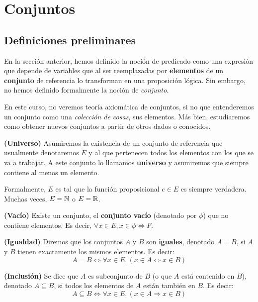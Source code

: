 
\section{Conjuntos}

\subsection{Definiciones preliminares}

En la sección anterior, hemos definido la noción de predicado como una expresión que depende de variables que al ser reemplazadas por \textbf{elementos} de un \textbf{conjunto} de referencia lo transforman en una proposición lógica. Sin embargo, no hemos definido formalmente la noción de \textit{conjunto}. 

En este curso, no veremos teoría axiomática de conjuntos, si no que entenderemos un conjunto como una \textit{colección de cosas}, sus elementos. Más bien, estudiaremos como obtener nuevos conjuntos a partir de otros dados o conocidos. 

\begin{definicion}
	\textbf{(Universo)}
	Asumiremos la existencia de un conjunto de referencia que usualmente denotaremos $E$ y al que pertenecen todos los elementos con los que se va a trabajar. A este conjunto lo llamamos \textbf{universo} y asumiremos que siempre contiene al menos un elemento. 
	
	Formalmente, $E$ es tal que la función proposicional $e\in E$ es siempre verdadera. Muchas veces, $E = \mathbb{N}$ o $E = \mathbb{R}$. 
\end{definicion}

\begin{definicion}
	\textbf{(Vacío)}
	Existe un conjunto, el \textbf{conjunto vacío} (denotado por $\phi$) que no contiene elementos. Es decir, $\forall x \in E, x \in \phi \iff F$. 
\end{definicion}

\begin{definicion}
	\textbf{(Igualdad)}
	Diremos que los conjuntos $A$ y $B$ son \textbf{iguales}, denotado $A=B$, si $A$ y $B$ tienen exactamente los mismos elementos. Es decir: 
	$$ A = B \iff \forall x \in E, (x \in A \iff x \in B ) $$ 
\end{definicion}

\begin{definicion}
	\textbf{(Inclusión)}
	Se dice que $A$ es subconjunto de $B$ (o que $A$ está contenido en $B$), denotado $A\subseteq B$, si todos los elementos de $A$ están también en $B$. Es decir: 
	$$ A \subseteq B \iff \forall x \in E, (x \in A \Longrightarrow x \in B) $$ 
\end{definicion}

